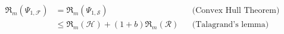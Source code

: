 \documentclass{article}
\begin{document}
\begin{align}
    \mathfrak{R}_{m}\left(\Psi_{1, \mathcal{F}}\right)  & =     \mathfrak{R}_{m}\left(\Psi_{1, \mathcal{S}}\right)    && \text{(Convex Hull Theorem)}         \\
                                                        & \leq   \mathfrak{R}_{m}(\mathcal{H}) + (1+b) \mathfrak{R}_{m}(\mathcal{R})    && \text{(Talagrand’s lemma)}         
\end{align}
\end{document}
